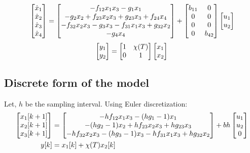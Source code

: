 \begin{equation}{\label{eqn::ctrl_state}}
     \begin{bmatrix} \dot x_1 \\
        \dot x_2\\
        \dot x_3\\
        \dot x_4 \end{bmatrix} =
    \begin{bmatrix} 
        -f_{12} x_1 x_3
        -g_1 x_1
        \\
        -g_2 x_2
        + f_{23} x_2 x_3
        + g_{23} x_3
        + f_{24} x_4
        \\
        -f_{32} x_2 x_3
        -g_3 x_3
        -f_{31} x_1 x_3
        + g_{32} x_2
        \\
        -g_4 x_4
     \end{bmatrix}
    + \begin{bmatrix} b_{11} & 0\\
          0     & 0\\
          0     & 0\\
          0     & b_{42}   \end{bmatrix}\begin{bmatrix} u_1 \\ u_2  \end{bmatrix}
\end{equation}
\begin{equation}\label{eqn::ctrl_out}
    \begin{bmatrix} y_1 \\ y_2 \end{bmatrix} = \begin{bmatrix} 1 & \chi(T)\\ 0 & 1 \end{bmatrix} \begin{bmatrix} x_1 \\ x_2 \end{bmatrix}
\end{equation}


\subsection{Discrete form of the model}
Let, $h$ be the sampling interval. Using Euler discretization:
\begin{align*}
    \begin{bmatrix} x_1[k+1] \\
        x_2[k+1] \\
        x_3[k+1] \\
         \end{bmatrix} &=
    \begin{bmatrix} 
        -hf_{12} x_1 x_3
        -(hg_1-1) x_1
        \\
        -(hg_2-1) x_2
        + hf_{23} x_2 x_3
        + hg_{23} x_3
        \\
        - hf_{32} x_2 x_3
        -(hg_3-1) x_3
        - hf_{31} x_1 x_3
        + hg_{32} x_2
     \end{bmatrix}
    + bh \begin{bmatrix} u_1 \\ u_2 \\ 0 \end{bmatrix}\\
    y[k] &= x_1[k] + \chi(T) x_2[k]
\end{align*}
